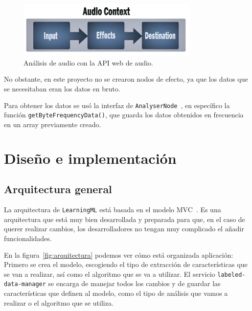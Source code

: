 \documentclass[a4paper, 12pt]{book}
\begin{document}
\begin{figure}
	\centering
	\includegraphics[width=9cm, keepaspectratio]{img/web-audio-api.png}
	\caption{Análisis de audio con la API web de audio.}\label{fig:audio-api}
\end{figure}

No obstante, en este proyecto no se crearon nodos de efecto, ya que los datos que se necesitaban eran los datos en bruto.

Para obtener los datos se usó la interfaz de \texttt{AnalyserNode}~\cite{analyser-node}, en específico la función \texttt{getByteFrequencyData()}, que guarda los datos obtenidos en frecuencia en un array previamente creado.


\cleardoublepage
\chapter{Diseño e implementación}
\label{chap:diseño-implementacion}

\section{Arquitectura general} 
\label{sec:arquitectura}

La arquitectura de \texttt{LearningML} está basada en el modelo MVC~\cite{mvc}. Es una arquitectura que está muy bien desarrollada y preparada para que, en el caso de querer realizar cambios, los desarrolladores no tengan muy complicado el añadir funcionalidades.

En la figura~\ref{fig:arquitectura} podemos ver cómo está organizada aplicación: Primero se crea el modelo, escogiendo el tipo de extracción de características que se van a realizar, así como el algoritmo que se va a utilizar. El servicio \texttt{labeled-data-manager} se encarga de manejar todos los cambios y de guardar las características que definen al modelo, como el tipo de análisis que vamos a realizar o el algoritmo que se utiliza.
\end{document}

